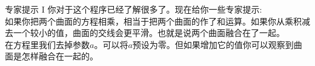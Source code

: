 ﻿\begin{surferPage}{专家提示 I}
你对于这个程序已经了解很多了。现在给你一些专家提示:\\
\vspace{0.3cm}
如果你把两个曲面的方程相乘，相当于把两个曲面的作了和运算。如果你从乘积减去一个较小的值，曲面的交线会更平滑。也就是说两个曲面融合在了一起。\\
\vspace{0.3cm}
在方程里我们去掉参数$a$。可以将$a$预设为零。但如果增加它的值你可以观察到曲面是怎样融合在一起的。
\end{surferPage}

